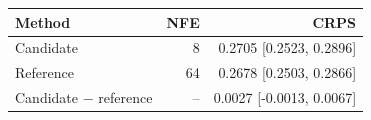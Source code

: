 \begin{tabular}{lrr}
\toprule
Method & NFE & CRPS \\
\midrule
Candidate & 8 & 0.2705 [0.2523, 0.2896] \\
Reference & 64 & 0.2678 [0.2503, 0.2866] \\
\midrule
Candidate $-$ reference & -- & 0.0027 [-0.0013, 0.0067] \\
\bottomrule
\end{tabular}
